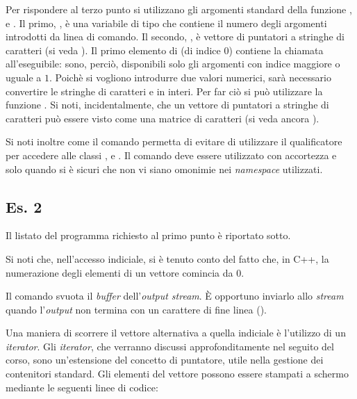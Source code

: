 Per rispondere al terzo punto si utilizzano gli argomenti standard
della funzione ,  e . Il primo,
, \`e una variabile di tipo  che contiene il numero
degli argomenti introdotti da linea di comando. Il secondo,
, \`e vettore di puntatori a stringhe di caratteri (si veda
). Il primo elemento di  (di indice $0$)
contiene la chiamata all'eseguibile: sono, perci\`o, disponibili solo
gli argomenti con indice maggiore o uguale a $1$. Poich\`e si vogliono
introdurre due valori numerici, sar\`a necessario convertire le
stringhe di caratteri  e  in interi. Per far
ci\`o si pu\`o utilizzare la funzione . Si noti,
incidentalmente, che un vettore di puntatori a stringhe di caratteri
pu\`o essere visto come una matrice di caratteri (si veda ancora
).
%
\lstset{basicstyle=\scriptsize\sf}

\lstset{basicstyle=\sf}
%
Si noti inoltre come il comando 
permetta di evitare di utilizzare il qualificatore  per
accedere alle classi ,  e . Il comando
 deve essere utilizzato con accortezza e solo
quando si \`e sicuri che non vi siano omonimie nei \emph{namespace}
utilizzati.

\subsection*{Es. 2}
Il listato del programma richiesto al primo punto \`e riportato sotto.
%
\lstset{basicstyle=\scriptsize\sf}

\lstset{basicstyle=\sf}

Si noti che, nell'accesso indiciale, si \`e tenuto conto del fatto
che, in C++, la numerazione degli elementi di un vettore comincia da
$0$.

Il comando  svuota il \emph{buffer} dell'\emph{output
  stream}. \`E opportuno inviarlo allo \emph{stream} quando
l'\emph{output} non termina con un carattere di fine linea
().

Una maniera di scorrere il vettore alternativa a quella indiciale \`e
l'utilizzo di un \emph{iterator}. Gli \emph{iterator}, che verranno
discussi approfonditamente nel seguito del corso, sono un'estensione
del concetto di puntatore, utile nella gestione dei contenitori
standard. Gli elementi del vettore  possono essere stampati
a schermo mediante le seguenti linee di codice:
\lstset{basicstyle=\scriptsize\sf}

\lstset{basicstyle=\sf}


